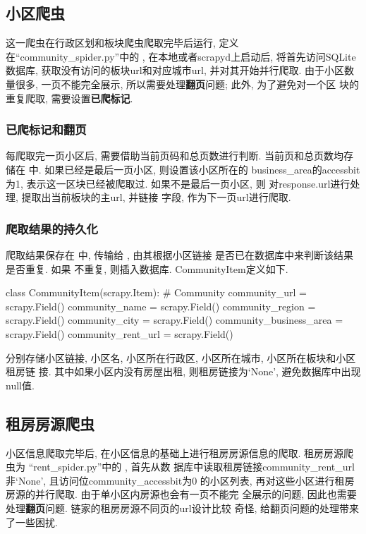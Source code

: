 \subsection{小区爬虫}
这一爬虫在行政区划和板块爬虫爬取完毕后运行, 定义在``community\_spider.py''中的
, 在本地或者scrapyd上启动后,
将首先访问SQLite数据库, 获取没有访问的板块url和对应城市url, 并对其开始并行爬取.
由于小区数量很多, 一页不能完全展示, 所以需要处理\textbf{翻页}问题; 此外, 为了避免对一个区
块的重复爬取, 需要设置\textbf{已爬标记}.

\subsubsection{已爬标记和翻页}
每爬取完一页小区后, 需要借助当前页码和总页数进行判断. 当前页和总页数均存储在
 中. 如果已经是最后一页小区, 则设置该小区所在的
business\_area的accessbit为1, 表示这一区块已经被爬取过. 如果不是最后一页小区, 则
对response.url进行处理, 提取出当前板块的主url, 并链接
字段, 作为下一页url进行爬取.

\subsubsection{爬取结果的持久化}
爬取结果保存在  中, 传输给
 , 由其根据小区链接
 是否已在数据库中来判断该结果是否重复. 如果
不重复, 则插入数据库. CommunityItem定义如下.
\begin{python}
    class CommunityItem(scrapy.Item):
    # Community
    community_url = scrapy.Field()
    community_name = scrapy.Field()
    community_region = scrapy.Field()
    community_city = scrapy.Field()
    community_business_area = scrapy.Field()
    community_rent_url = scrapy.Field()
\end{python}
分别存储小区链接, 小区名, 小区所在行政区, 小区所在城市, 小区所在板块和小区租房链
接. 其中如果小区内没有房屋出租, 则租房链接为`None', 避免数据库中出现null值.

\subsection{租房房源爬虫}
小区信息爬取完毕后, 在小区信息的基础上进行租房房源信息的爬取. 租房房源爬虫为
``rent\_spider.py''中的 , 首先从数
据库中读取租房链接community\_rent\_url非`None', 且访问位community\_accessbit为0
的小区列表, 再对这些小区进行租房房源的并行爬取. 由于单小区内房源也会有一页不能完
全展示的问题, 因此也需要处理\textbf{翻页}问题. 链家的租房房源不同页的url设计比较
奇怪, 给翻页问题的处理带来了一些困扰.

